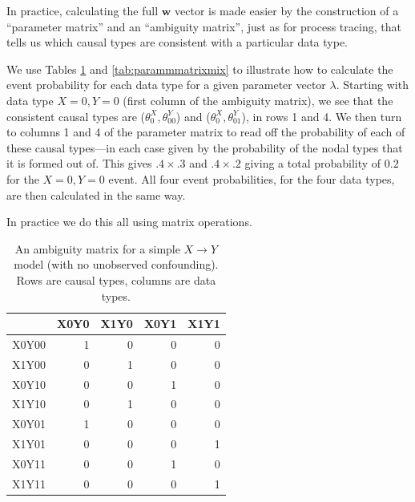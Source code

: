 \documentclass[
  12pt,
]{book}
\begin{document}
In practice, calculating the full \(\mathbf w\) vector is made easier by the construction of a ``parameter matrix'' and an ``ambiguity matrix'', just as for process tracing, that tells us which causal types are consistent with a particular data type.

We use Tables \ref{tab:ambigmatrixmix} and \ref{tab:parammmatrixmix} to illustrate how to calculate the event probability for each data type for a given parameter vector \(\lambda\). Starting with data type \(X=0, Y=0\) (first column of the ambiguity matrix), we see that the consistent causal types are (\(\theta^X_0, \theta^Y_{00}\)) and (\(\theta^X_0, \theta^Y_{01}\)), in rows 1 and 4. We then turn to columns 1 and 4 of the parameter matrix to read off the probability of each of these causal types---in each case given by the probability of the nodal types that it is formed out of. This gives \(.4 \times .3\) and \(.4\times .2\) giving a total probability of \(0.2\) for the \(X=0, Y=0\) event. All four event probabilities, for the four data types, are then calculated in the same way.

In practice we do this all using matrix operations.

\begin{table}

\caption{\label{tab:ambigmatrixmix}An ambiguity matrix for a simple $X \rightarrow Y$ model (with no unobserved confounding). Rows are causal types, columns are data types.}
\centering
\begin{tabular}[t]{l|r|r|r|r}
\hline
  & X0Y0 & X1Y0 & X0Y1 & X1Y1\\
\hline
X0Y00 & 1 & 0 & 0 & 0\\
\hline
X1Y00 & 0 & 1 & 0 & 0\\
\hline
X0Y10 & 0 & 0 & 1 & 0\\
\hline
X1Y10 & 0 & 1 & 0 & 0\\
\hline
X0Y01 & 1 & 0 & 0 & 0\\
\hline
X1Y01 & 0 & 0 & 0 & 1\\
\hline
X0Y11 & 0 & 0 & 1 & 0\\
\hline
X1Y11 & 0 & 0 & 0 & 1\\
\hline
\end{tabular}
\end{table}
\end{document}
